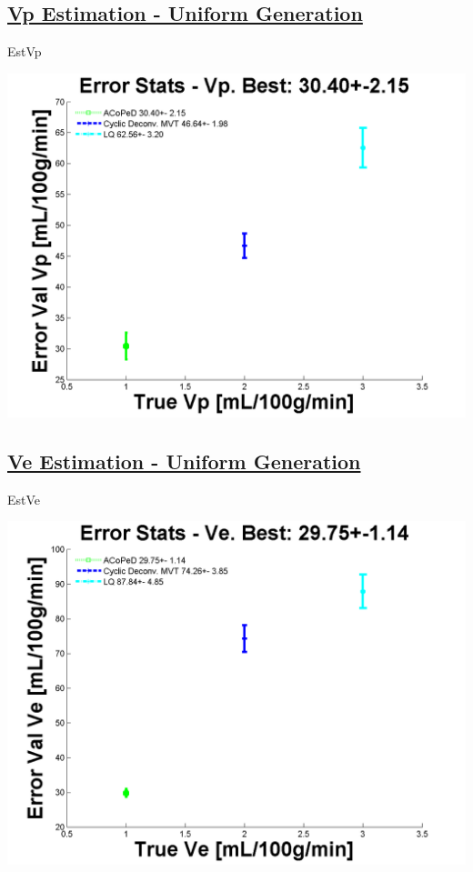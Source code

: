\documentclass[english]{article}
\begin{document}
\subsection*{\underline{Vp Estimation - Uniform Generation}}

EstVp




\includegraphics[scale=0.7]{Est_Vp_Uniform.png}

\subsection*{\underline{Ve Estimation - Uniform Generation}}

EstVe




\includegraphics[scale=0.7]{Est_Ve_Uniform.png}
\end{document}
